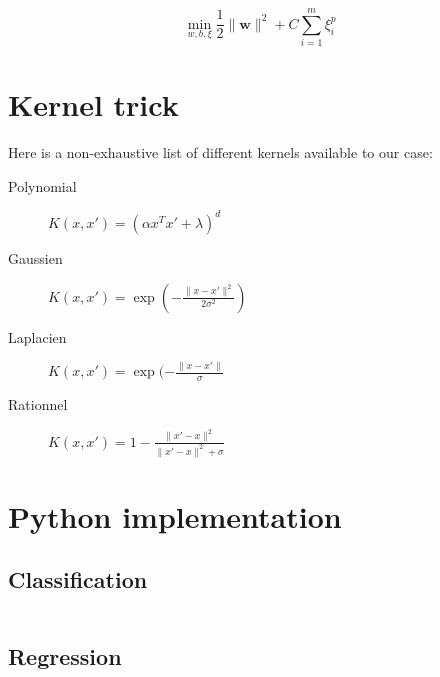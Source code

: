 \begin{equation}
	\min_{w,b,\xi} \frac{1}{2} \lVert \mathbf w \rVert ^2 + C\sum_{i=1}^m \xi_i^p
\end{equation}


\section{Kernel trick}

Here is a non-exhaustive list of different kernels available to our case:
\begin{description}
	\item[Polynomial] $K(x, x\prime) = (\alpha x^T x\prime + \lambda )^d$
	\item[Gaussien] $K(x, x\prime) = \exp(-\frac{\lVert x - x\prime \rVert^2}{2\sigma^2})$
	\item[Laplacien] $K(x, x\prime) = \exp(-\frac{\lVert x - x\prime\rVert}{\sigma}$
	\item[Rationnel] $K(x, x\prime) = 1 - \frac{\lVert x\prime - x \rVert^2}{\lVert x\prime - x \rVert^2 + \sigma}$
\end{description}


\section{Python implementation}

\subsection{Classification}

\inputminted{python}{code/machine-learning/svc.py}

\subsection{Regression}

\inputminted{python}{code/machine-learning/svr.py}

